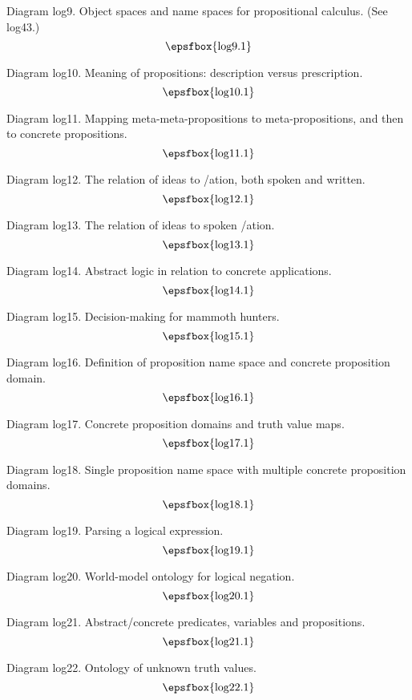 Diagram log9. Object spaces and name spaces for propositional calculus. (See
log43.)
$$
\centerline{\epsfbox{log9.1}}
$$

\filleject

Diagram log10. Meaning of propositions: description versus prescription.
$$
\centerline{\epsfbox{log10.1}}
$$

Diagram log11. Mapping meta-meta-propositions to meta-propositions, and then to
concrete propositions.
$$
\centerline{\epsfbox{log11.1}}
$$

Diagram log12. The relation of ideas to \verbalis/ation, both spoken and
written.
$$
\centerline{\epsfbox{log12.1}}
$$

Diagram log13. The relation of ideas to spoken \verbalis/ation.
$$
\centerline{\epsfbox{log13.1}}
$$

Diagram log14. Abstract logic in relation to concrete applications.
$$
\centerline{\epsfbox{log14.1}}
$$

\filleject

Diagram log15. Decision-making for mammoth hunters.
$$
\centerline{\epsfbox{log15.1}}
$$

Diagram log16. Definition of proposition name space and concrete proposition
domain.
$$
\centerline{\epsfbox{log16.1}}
$$

Diagram log17. Concrete proposition domains and truth value maps.
$$
\centerline{\epsfbox{log17.1}}
$$

\filleject

Diagram log18. Single proposition name space with multiple concrete proposition
domains.
$$
\centerline{\epsfbox{log18.1}}
$$

Diagram log19. Parsing a logical expression.
$$
\centerline{\epsfbox{log19.1}}
$$

Diagram log20. World-model ontology for logical negation.
$$
\centerline{\epsfbox{log20.1}}
$$

\filleject

Diagram log21. Abstract/concrete predicates, variables and propositions.
$$
\centerline{\epsfbox{log21.1}}
$$

Diagram log22. Ontology of unknown truth values.
$$
\centerline{\epsfbox{log22.1}}
$$

